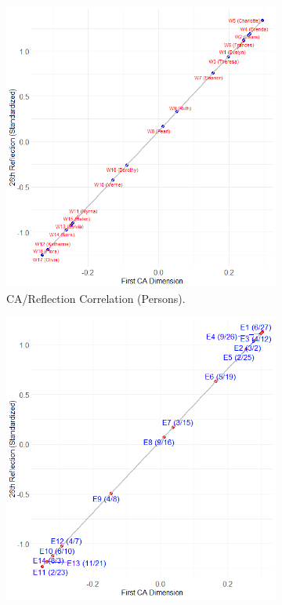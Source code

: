 \documentclass[a4paper,fleqn]{cas-sc}
\begin{document}
\begin{figure}
    \captionsetup[subfigure]{font=footnotesize,labelfont=footnotesize}
    \centering
     \begin{subfigure}[b]{0.45\textwidth}
        \includegraphics[width=1.0\textwidth]{Plots/p-ca-ref-corr.png}
            \caption{CA/Reflection Correlation (Persons).}
            \label{fig:p-ca-ref}
    \end{subfigure}
     \begin{subfigure}[b]{0.45\textwidth}
        \includegraphics[width=1.0\textwidth]{Plots/g-ca-ref-corr.png}

\end{subfigure}
\end{figure}
\end{document}

